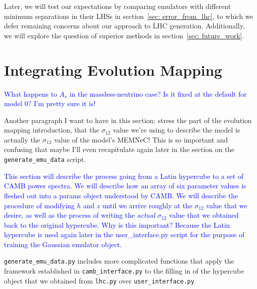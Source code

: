 
Later, we will test our expectations by comparing emulators with different
minimum separations in their LHSs in section~\ref{sec: error_from_lhc}, to
which we defer remaining concerns about our approach to LHC generation.
Additionally, we will explore the question of superior methods in
section~\ref{sec: future_work}.

\section{Integrating Evolution Mapping}
\label{sec: generate_emu_data}

\textcolor{blue}{What happens to $A_s$ in the massless-neutrino case? Is it 
fixed at the default for model 0? I'm pretty sure it is!}

Another paragraph I want to have in this section: stress the part of the 
evolution mapping introduction, that the $\sigma_{12}$ value we're using to 
describe the model is actually the $\sigma_{12}$ value of the model's MEMNeC! 
This is so important and confusing that maybe I'll even recapitulate again 
later in the section on the \verb|generate_emu_data| script.


\textcolor{blue}{This section will describe the process going from a Latin 
hypercube to a set of CAMB power spectra. We will describe how an array of six 
parameter values is fleshed out into a params object understood by CAMB. We 
will describe the procedure of modifying $h$ and $z$ until we arrive roughly 
at the $\sigma_{12}$ value that we desire, as well as the process of writing 
the \textit{actual} $\sigma_{12}$ value that we obtained back to the original 
hypercube. Why is this important? Because the Latin hypercube is used again 
later in the user\_interface.py script for the purpose of training the 
Gaussian emulator object.}

\verb|generate_emu_data.py| includes more complicated functions that apply the 
framework established in \verb|camb_interface.py| to the filling in of the 
hypercube object that we obtained from \verb|lhc.py| over
\verb|user_interface.py|.

